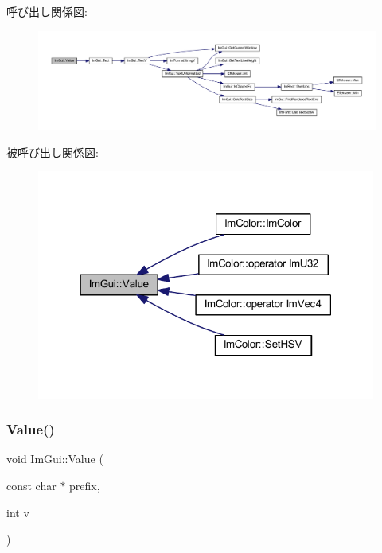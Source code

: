 呼び出し関係図\+:\nopagebreak
\begin{figure}[H]
\begin{center}
\leavevmode
\includegraphics[width=350pt]{namespace_im_gui_a1b3324308e43eeded5c3599fa0f03e85_cgraph}
\end{center}
\end{figure}
被呼び出し関係図\+:\nopagebreak
\begin{figure}[H]
\begin{center}
\leavevmode
\includegraphics[width=316pt]{namespace_im_gui_a1b3324308e43eeded5c3599fa0f03e85_icgraph}
\end{center}
\end{figure}
\mbox{\label{namespace_im_gui_a654ceb70f2dd1598f88861f54764ee08}} 
\subsubsection{\texorpdfstring{Value()}{Value()}\hspace{0.1cm}{\footnotesize\ttfamily [2/4]}}
{\footnotesize\ttfamily void Im\+Gui\+::\+Value (\begin{DoxyParamCaption}\item[{const char $\ast$}]{prefix,  }\item[{int}]{v }\end{DoxyParamCaption})}



